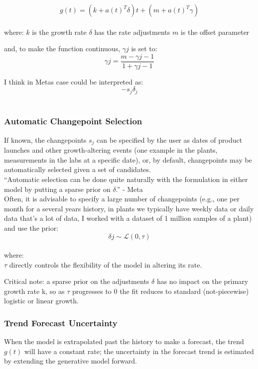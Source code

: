 \begin{equation}
    g(t)= (k+a(t)^T \delta  )t+(m+a(t)^T \gamma )
\end{equation} \\

where:
$k$ is the growth rate
$\delta $ has the rate adjustments
$m$ is the offset parameter

and, to make the function continuous, $\gamma j$ is set to:
\begin{equation}
    \gamma j = \frac{m-\gamma j-1}{1+\gamma j-1}
\end{equation}

I think in Metas case could be interpreted as:
\begin{equation}
    -s_j \delta_j
\end{equation} \\

\subsubsection{Automatic Changepoint Selection}
If known, the changepoints $s_j$ can be specified by the user as dates of product launches and other growth-altering events (one example in the plants, measurements in the labs at a specific date), or, by default, changepoints may be automatically selected given a set of candidates.\\
“Automatic selection can be done quite naturally with the formulation in either model by putting a sparse prior on $\delta$.” - Meta \\ 
Often, it is advisable to specify a large number of changepoints (e.g., one per month for a several years history, in plants we typically have weekly data or daily data that’s a lot of data, I worked with a dataset of 1 million samples of a plant) and use the prior:
\begin{equation}
    \delta{j} \sim \mathcal{L}(0,\tau)
\end{equation} \\

where: \\
$\tau$ directly controls the flexibility of the model in altering its rate.

Critical note: a sparse prior on the adjustments $\delta$ has no impact on the primary growth rate k, so as $\tau$ progresses to 0 the fit reduces to standard (not-piecewise) logistic or linear growth.

\subsubsection{Trend Forecast Uncertainty}
When the model is extrapolated past the history to make a forecast, the trend $g(t)$ will have a constant rate; the uncertainty in the forecast trend is estimated by extending the generative model forward.\\

